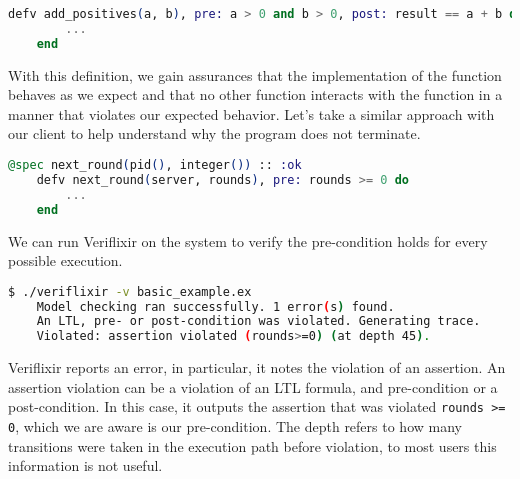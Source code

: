\begin{lstlisting}[language=Elixir, xleftmargin=.0\linewidth, caption={Example usage of pre- and post-conditions in LTLixir}]
    defv add_positives(a, b), pre: a > 0 and b > 0, post: result == a + b do
        ...
    end
\end{lstlisting}
With this definition, we gain assurances that the implementation of the function behaves as we expect and that no other function interacts with the function in a manner that violates our expected behavior. Let's take a similar approach with our client to help understand why the program does not terminate.
\begin{lstlisting}[language=Elixir, xleftmargin=.3\linewidth]
    @spec next_round(pid(), integer()) :: :ok
    defv next_round(server, rounds), pre: rounds >= 0 do
        ...
    end
\end{lstlisting}
We can run Veriflixir on the system to verify the pre-condition holds for every possible execution.
\begin{lstlisting}[language=bash, xleftmargin=.1\linewidth]
    $ ./veriflixir -v basic_example.ex
    Model checking ran successfully. 1 error(s) found.
    An LTL, pre- or post-condition was violated. Generating trace.
    Violated: assertion violated (rounds>=0) (at depth 45).
\end{lstlisting}
Veriflixir reports an error, in particular, it notes the violation of an assertion. An assertion violation can be a violation of an LTL formula, and pre-condition or a post-condition. In this case, it outputs the assertion that was violated \texttt{rounds >= 0}, which we are aware is our pre-condition. The depth refers to how many transitions were taken in the execution path before violation, to most users this information is not useful.
